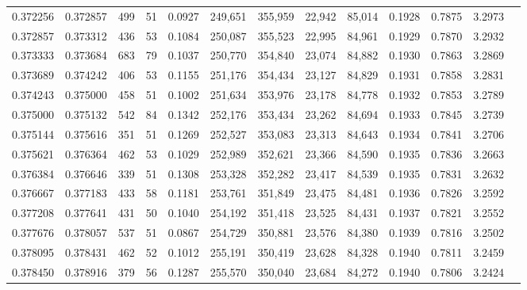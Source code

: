\begin{tabular}{rrrrrrrrrrrrr}
0.372256 & 0.372857 &    499 &    51 &                                     0.0927 & 249,651 & 355,959 &  22,942 &  85,014 & 0.1928 & 0.7875 & 3.2973 \\
0.372857 & 0.373312 &    436 &    53 &                                     0.1084 & 250,087 & 355,523 &  22,995 &  84,961 & 0.1929 & 0.7870 & 3.2932 \\
0.373333 & 0.373684 &    683 &    79 &                                     0.1037 & 250,770 & 354,840 &  23,074 &  84,882 & 0.1930 & 0.7863 & 3.2869 \\
0.373689 & 0.374242 &    406 &    53 &                                     0.1155 & 251,176 & 354,434 &  23,127 &  84,829 & 0.1931 & 0.7858 & 3.2831 \\
0.374243 & 0.375000 &    458 &    51 &                                     0.1002 & 251,634 & 353,976 &  23,178 &  84,778 & 0.1932 & 0.7853 & 3.2789 \\
0.375000 & 0.375132 &    542 &    84 &                                     0.1342 & 252,176 & 353,434 &  23,262 &  84,694 & 0.1933 & 0.7845 & 3.2739 \\
0.375144 & 0.375616 &    351 &    51 &                                     0.1269 & 252,527 & 353,083 &  23,313 &  84,643 & 0.1934 & 0.7841 & 3.2706 \\
0.375621 & 0.376364 &    462 &    53 &                                     0.1029 & 252,989 & 352,621 &  23,366 &  84,590 & 0.1935 & 0.7836 & 3.2663 \\
0.376384 & 0.376646 &    339 &    51 &                                     0.1308 & 253,328 & 352,282 &  23,417 &  84,539 & 0.1935 & 0.7831 & 3.2632 \\
0.376667 & 0.377183 &    433 &    58 &                                     0.1181 & 253,761 & 351,849 &  23,475 &  84,481 & 0.1936 & 0.7826 & 3.2592 \\
0.377208 & 0.377641 &    431 &    50 &                                     0.1040 & 254,192 & 351,418 &  23,525 &  84,431 & 0.1937 & 0.7821 & 3.2552 \\
0.377676 & 0.378057 &    537 &    51 &                                     0.0867 & 254,729 & 350,881 &  23,576 &  84,380 & 0.1939 & 0.7816 & 3.2502 \\
0.378095 & 0.378431 &    462 &    52 &                                     0.1012 & 255,191 & 350,419 &  23,628 &  84,328 & 0.1940 & 0.7811 & 3.2459 \\
0.378450 & 0.378916 &    379 &    56 &                                     0.1287 & 255,570 & 350,040 &  23,684 &  84,272 & 0.1940 & 0.7806 & 3.2424 \\

\end{tabular}

